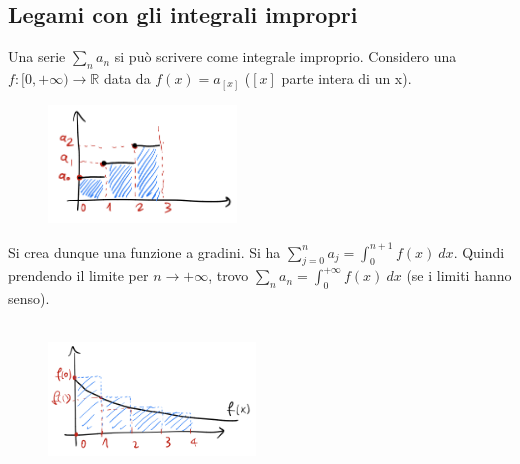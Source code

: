 \subsection{Legami con gli integrali impropri}
Una serie $\sum_n a_n$ si può scrivere come integrale improprio. Considero una $f: [0,+\infty) \to \mathbb{R}$ data da $f(x)=a_{[x]}$ ($[x]$ parte intera di un x).\\
\begin{figure}
    \vspace{-33pt}
    \centering
    \includegraphics[width=5cm]{images/legame-serie-integrali-impropri.png}
\end{figure}
Si crea dunque una funzione a gradini. Si ha $\sum_{j=0}^n a_j = \int_0^{n+1}f(x)\:dx$. Quindi prendendo il limite per $n\to +\infty$, trovo $\sum_n a_n = \int_0^{+\infty}f(x)\:dx$ (se i limiti hanno senso).\\\\
\begin{figure}
    \vspace{-30pt}
    \centering
    \includegraphics[width=5.5cm]{images/legame-serie-integrali-impropri-2.png}
\end{figure}

